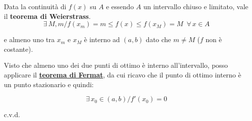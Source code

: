 \documentclass[../dimostrazioni]{subfiles}
\begin{document}
            Data la continuità di \(f(x)\) su \(A\) e essendo \(A\) un intervallo chiuso e limitato, vale il \textbf{teorema di Weierstrass}.
            \[ \exists \, M, m / f(x_m)=m \leqslant f(x) \leqslant f(x_M) = M \, \, \, \forall \, x \in A \]

            e almeno uno tra \(x_m\) e \(x_M\) è interno ad \( (a,b) \) dato che \( m \neq M \) (\( f \) non è costante).

            Visto che almeno uno dei due punti di ottimo è interno all'intervallo, posso applicare il \textbf{\hyperref[teoFermat]{teorema di Fermat}}, da cui ricavo che il punto di ottimo interno è un punto stazionario e quindi:

            \[\exists \, x_0 \in (a,b) / f'(x_0) = 0 \]
            
            c.v.d.

    
\end{document}

